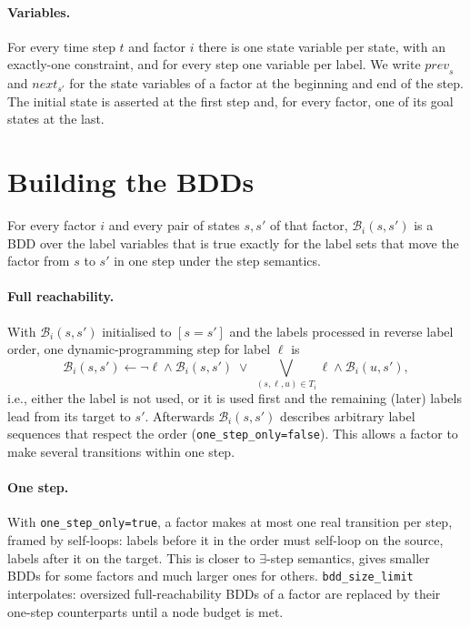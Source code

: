 \documentclass[manuscript, screen]{jair}
\newcommand{\opt}[1]{\texttt{#1}}
\newcommand{\B}{\mathcal{B}}
\newcommand{\prev}[1]{\mathit{prev}_{#1}}
\newcommand{\nxt}[1]{\mathit{next}_{#1}}
\begin{document}
\paragraph{Variables.} For every time step $t$ and factor $i$ there is one state variable per state,
with an exactly-one constraint, and for every step one variable per label. We write $\prev{s}$ and
$\nxt{s'}$ for the state variables of a factor at the beginning and end of the step. The initial
state is asserted at the first step and, for every factor, one of its goal states at the last.

\section{Building the BDDs}\label{sec:bdds}

For every factor $i$ and every pair of states $s, s'$ of that factor, $\B_i(s,s')$ is a BDD over the
label variables that is true exactly for the label sets that move the factor from $s$ to $s'$ in one
step under the step semantics.

\paragraph{Full reachability.} With $\B_i(s,s')$ initialised to $[s = s']$ and the labels processed in
reverse label order, one dynamic-programming step for label $\ell$ is
\[
  \B_i(s,s') \leftarrow \neg\ell \wedge \B_i(s,s') \;\vee\; \bigvee_{(s,\ell,u) \in T_i} \ell \wedge \B_i(u,s'),
\]
i.e., either the label is not used, or it is used first and the remaining (later) labels lead from
its target to $s'$. Afterwards $\B_i(s,s')$ describes arbitrary label sequences that respect the order
(\opt{one\_step\_only=false}). This allows a factor to make several transitions within one step.

\paragraph{One step.} With \opt{one\_step\_only=true}, a factor makes at most one real transition per
step, framed by self-loops: labels before it in the order must self-loop on the source, labels after
it on the target. This is closer to $\exists$-step semantics, gives smaller BDDs for some factors and
much larger ones for others. \opt{bdd\_size\_limit} interpolates: oversized full-reachability BDDs of
a factor are replaced by their one-step counterparts until a node budget is met.
\end{document}
